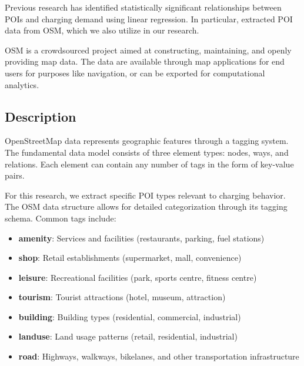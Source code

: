 Previous research  has identified statistically significant relationships between POIs and charging demand using linear regression. In particular, \cite{hechtGlobalElectricVehicle2024} extracted POI data from \acrfull{OSM}, which we also utilize in our research.


\acrlong{OSM}  is a crowdsourced project aimed at constructing, maintaining, and openly providing map data. The data are available through map applications for end users for purposes like navigation, or can be exported for computational analytics.

\subsection{Description}

OpenStreetMap data represents geographic features through a tagging system. The fundamental data model consists of three element types: nodes, ways, and relations. Each element can contain any number of tags in the form of key-value pairs.

For this research, we extract specific POI types relevant to charging behavior. The OSM data structure allows for detailed categorization through its tagging schema. Common tags include:

\begin{itemize}
    \item \textbf{amenity}: Services and facilities (restaurants, parking, fuel stations)
    \item \textbf{shop}: Retail establishments (supermarket, mall, convenience)
    \item \textbf{leisure}: Recreational facilities (park, sports centre, fitness centre)
    \item \textbf{tourism}: Tourist attractions (hotel, museum, attraction)
    \item \textbf{building}: Building types (residential, commercial, industrial)
    \item \textbf{landuse}: Land usage patterns (retail, residential, industrial)
    \item \textbf{road}: Highways, walkways, bikelanes, and other transportation infrastructure
\end{itemize}

